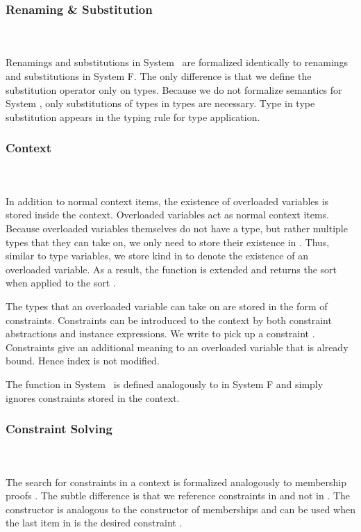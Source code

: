 \subsubsection{Renaming \& Substitution}\hfill\\\\
Renamings and substitutions in System \Fo\ are formalized identically to renamings and substitutions in System F. 
The only difference is that we define the substitution operator only on types. 
\Fosubs
Because we do not formalize semantics for System \Fo, only substitutions of types in types are necessary. Type in type substitution appears in the typing rule for type application.

\subsubsection{Context}\hfill\\\\
In addition to normal context items, the existence of overloaded variables is stored inside the context. Overloaded variables act as normal context items. 
Because overloaded variables themselves do not have a type, but rather multiple types that they can take on, we only need to store their existence in . Thus, similar to type variables, we store kind  in  to denote the existence of an overloaded variable. As a result, the  function is extended and returns the sort  when applied to the sort .

\noindent The types that an overloaded variable can take on are stored in the form of constraints. Constraints can be introduced to the context by both constraint abstractions and instance expressions.
\FoCtx
We write    to pick up a constraint . 
Constraints give an additional meaning to an overloaded variable that is already bound. Hence index  is not modified. 

\noindent The  function in System \Fo\ is defined analogously to  in System F and simply ignores constraints stored in the context.

\subsubsection{Constraint Solving}\hfill\\\\
The search for constraints in a context is formalized analogously to membership proofs   . The subtle difference is that we reference constraints in  and not in . 
\FoCstrSolve
The  constructor is analogous to the  constructor of memberships and can be used when the last item in  is the desired constraint .

